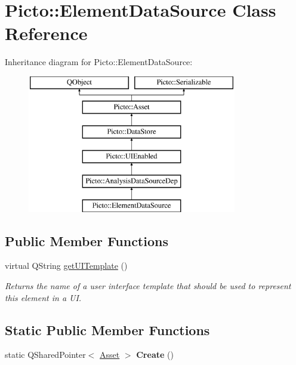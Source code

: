 \hypertarget{class_picto_1_1_element_data_source}{\section{Picto\-:\-:Element\-Data\-Source Class Reference}
\label{class_picto_1_1_element_data_source}
}
Inheritance diagram for Picto\-:\-:Element\-Data\-Source\-:\begin{figure}[H]
\begin{center}
\leavevmode
\includegraphics[height=6.000000cm]{class_picto_1_1_element_data_source}
\end{center}
\end{figure}
\subsection*{Public Member Functions}
\begin{DoxyCompactItemize}
\item 
\hypertarget{class_picto_1_1_element_data_source_a929027d6b6830263ee934d50997df5dc}{virtual Q\-String \hyperlink{class_picto_1_1_element_data_source_a929027d6b6830263ee934d50997df5dc}{get\-U\-I\-Template} ()}\label{class_picto_1_1_element_data_source_a929027d6b6830263ee934d50997df5dc}

\begin{DoxyCompactList}\small\item\em Returns the name of a user interface template that should be used to represent this element in a U\-I. \end{DoxyCompactList}\end{DoxyCompactItemize}
\subsection*{Static Public Member Functions}
\begin{DoxyCompactItemize}
\item 
\hypertarget{class_picto_1_1_element_data_source_a6fc17a3a8c19d359b26446bd7e40928b}{static Q\-Shared\-Pointer$<$ \hyperlink{class_picto_1_1_asset}{Asset} $>$ {\bfseries Create} ()}\label{class_picto_1_1_element_data_source_a6fc17a3a8c19d359b26446bd7e40928b}

\end{DoxyCompactItemize}
